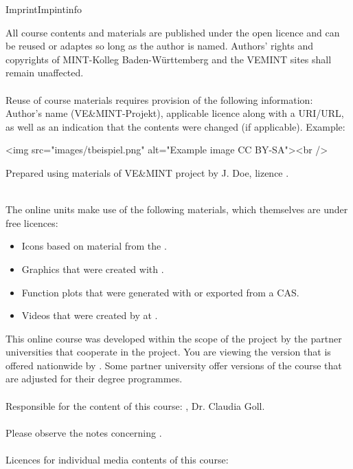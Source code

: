 \begin{MXContent}{Imprint}{Impint}{info}

All course contents and materials are published under the open licence 
and can be reused or adaptes so long as the author is named.
Authors' rights and copyrights of MINT-Kolleg Baden-Württemberg and
the VEMINT sites shall remain unaffected.
\ \\ \ \\
Reuse of course materials requires provision of the following information: Author's name (VE\&MINT-Projekt), applicable licence along with a URI/URL,
as well as an indication that the contents were changed (if applicable). Example:

\begin{center}
\begin{html}
<img src="images/tbeispiel.png" alt="Example image CC BY-SA"><br />
\end{html}
Prepared using materials of VE\&MINT project by J. Doe, lizence .
\end{center}
\ \\

The online units make use of the following materials, which themselves are under free licences:
\begin{itemize}
\item{Icons based on material from the .}
\item{Graphics that were created with .}
\item{Function plots that were generated with  or exported from a CAS.}
\item{Videos that were created by  at .}
\end{itemize}

This online course was developed within the scope of the  project by the partner universities that cooperate in the project.
You are viewing the version that is offered nationwide by .
Some partner university offer versions of the course that are adjusted for their degree programmes.
\ \\ \ \\
Responsible for the content of this course: , Dr. Claudia Goll. 
\ \\ \ \\
Please observe the notes concerning .
\ \\ \ \\
Licences for individual media contents of this course:\ \\
\MCopyrightCollection




\end{MXContent}
